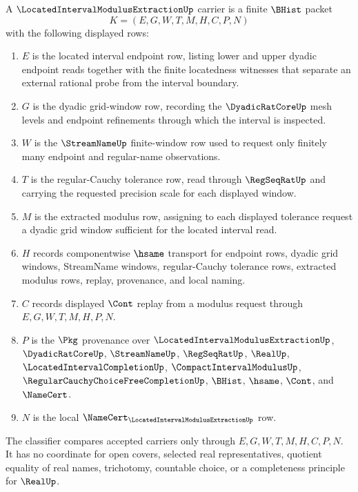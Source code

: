 \begin{definition}
\label{def:located-interval-modulus-extraction-carrier}
A $\LocatedIntervalModulusExtractionUp$ carrier is a finite $\BHist$ packet
$$
K=(E,G,W,T,M,H,C,P,N)
$$
with the following displayed rows:
\begin{enumerate}
\item $E$ is the located interval endpoint row, listing lower and upper dyadic endpoint reads together with the finite locatedness witnesses that separate an external rational probe from the interval boundary.
\item $G$ is the dyadic grid-window row, recording the $\DyadicRatCoreUp$ mesh levels and endpoint refinements through which the interval is inspected.
\item $W$ is the $\StreamNameUp$ finite-window row used to request only finitely many endpoint and regular-name observations.
\item $T$ is the regular-Cauchy tolerance row, read through $\RegSeqRatUp$ and carrying the requested precision scale for each displayed window.
\item $M$ is the extracted modulus row, assigning to each displayed tolerance request a dyadic grid window sufficient for the located interval read.
\item $H$ records componentwise $\hsame$ transport for endpoint rows, dyadic grid windows, StreamName windows, regular-Cauchy tolerance rows, extracted modulus rows, replay, provenance, and local naming.
\item $C$ records displayed $\Cont$ replay from a modulus request through $E,G,W,T,M,H,P,N$.
\item $P$ is the $\Pkg$ provenance over $\LocatedIntervalModulusExtractionUp$, $\DyadicRatCoreUp$, $\StreamNameUp$, $\RegSeqRatUp$, $\RealUp$, $\LocatedIntervalCompletionUp$, $\CompactIntervalModulusUp$, $\RegularCauchyChoiceFreeCompletionUp$, $\BHist$, $\hsame$, $\Cont$, and $\NameCert$.
\item $N$ is the local $\NameCert_{\LocatedIntervalModulusExtractionUp}$ row.
\end{enumerate}
The classifier compares accepted carriers only through $E,G,W,T,M,H,C,P,N$. It has no coordinate for open covers, selected real representatives, quotient equality of real names, trichotomy, countable choice, or a completeness principle for $\RealUp$.
\end{definition}

